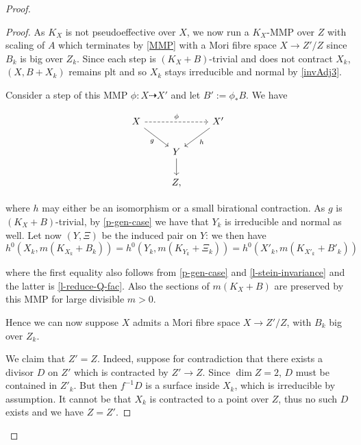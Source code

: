 \begin{proof}
	\begin{proof}
		
		As $K_X$ is not pseudoeffective over $X$, we now run a $K_{X}$-MMP over $Z$ with scaling of $A$ which terminates by \autoref{MMP} with a Mori fibre space $X \to Z'/Z$ since $B_k$ is big over $Z_k$. 
		Since each step is $(K_{X}+B)$-trivial and does not contract $X_{k}$, $(X,B+X_{k})$ remains plt and so $X_{k}$ stays irreducible and normal by \autoref{invAdj3}.
		
		Consider a step of this MMP $\phi \colon X \dashrightarrow X'$ and let $B':=\phi_*B$.  We have
		
		\[\begin{tikzcd}
			X \arrow[swap, rd, "g"] \arrow[rr, "\phi", dashed] &                 & X' \arrow[ld, "h"] \\
			& Y \arrow[d] &                        \\
			& Z ,         &                       
		\end{tikzcd}\]

where $h$ may either be an isomorphism or a small birational contraction. As $g$ is $(K_X+B)$-trivial, by \autoref{p-gen-case} we have that $Y_k$ is irreducible and normal as well. Let now $(Y,\Xi)$ be the induced pair on $Y$: we then have
		$$h^{0}(X_{k},m(K_{X_k}+B_{k}))=h^{0}(Y_{k},m(K_{Y_{k}}+\Xi_k))=h^{0}(X'_{k},m(K_{X'_k}+B'_{k}))$$ 
		
		where the first equality also follows from \autoref{p-gen-case} and \autoref{l-stein-invariance} and the latter is \autoref{l-reduce-Q-fac}. Also the sections of $m(K_{X}+B)$ are preserved by this MMP for large divisible $m > 0$.
		
		Hence we can now suppose $X$ admits a Mori fibre space $X \to Z'/Z$, with $B_{k}$ big over $Z_{k}$.
		
		We claim that $Z'=Z$.
		Indeed, suppose for contradiction that there exists a divisor $D$ on $Z'$ which is contracted by $Z' \to Z$. Since $\dim Z=2$, $D$ must be contained in $Z'_k$. But then $f^{-1}D$ is a surface inside $X_{k}$, which is irreducible by assumption. It cannot be that $X_{k}$ is contracted to a point over $Z$, thus no such $D$ exists and we have $Z=Z'$.
		

\end{proof}
\end{proof}
